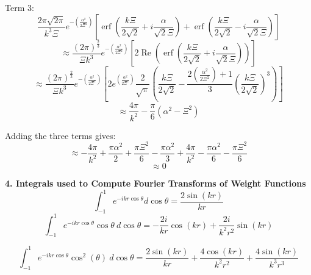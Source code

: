\documentclass[double,12pt]{beavtex}
\begin{document}
Term 3:
\begin{equation}{\frac{2\pi\sqrt{2\pi}}{k^3\Xi}e^{-\left(\frac{\alpha^2}{2\Xi^2}\right)}\left[\operatorname{erf}\left(\frac{k\Xi}{2\sqrt{2}}+i\frac{\alpha}{\sqrt{2}\Xi}\right)+\operatorname{erf}\left(\frac{k\Xi}{2\sqrt{2}}-i\frac{\alpha}{\sqrt{2}\Xi}\right)\right]}\end{equation}
\begin{displaymath}{\approx\frac{\left(2\pi\right)^\frac{2}{3}}{\Xi{k}^3}e^{-\left(\frac{\alpha^2}{2\Xi^2}\right)}\left[2\operatorname{Re}\left(\operatorname{erf}\left(\frac{k\Xi}{2\sqrt{2}}+i\frac{\alpha}{\sqrt{2}\Xi}\right)\right)\right]}\end{displaymath} 
\begin{displaymath}{\approx\frac{\left(2\pi\right)^\frac{2}{3}}{\Xi{k}^3}e^{-\left(\frac{\alpha^2}{2\Xi^2}\right)}\left[2e^{\left(\frac{\alpha^2}{2\Xi^2}\right)}\frac{2}{\sqrt{\pi}}   \left(\frac{k\Xi}{2\sqrt{2}}   -\frac{2\left(\frac{\alpha^2}{2\Xi^2}\right)+1}{3}\left(\frac{k\Xi}{2\sqrt{2}}\right)^3\right)\right]}\end{displaymath}
\begin{displaymath}{\approx\frac{4\pi}{k^2}-\frac{\pi}{6}\left(\alpha^2-\Xi^2\right)}\end{displaymath}  

Adding the three terms gives:
\begin{displaymath}{\approx-\frac{4\pi}{k^2}+\frac{\pi\alpha^2}{2}+\frac{\pi\Xi^2}{6}-\frac{\pi\alpha^2}{3}+\frac{4\pi}{k^2}-\frac{\pi\alpha^2}{6}-\frac{\pi\Xi^2}{6}}\end{displaymath} 
\begin{displaymath}{\approx0}\end{displaymath} 

\textbf{4. Integrals used to Compute Fourier Transforms of Weight Functions}
\begin{equation}{\int_{-1}^{1}{e^{-ikr\cos{\theta}}d{\cos{\theta}}}=\frac{2\sin(kr)}{kr}}\end{equation} 
\begin{equation}{\int_{-1}^{1}{e^{-ikr\cos{\theta}}\cos{\theta}{~}d{\cos{\theta}}}=-\frac{2i}{kr}\cos(kr)+\frac{2i}{k^2r^2}\sin(kr)}\end{equation} 

\begin{equation}{\int_{-1}^{1}{e^{-ikr\cos{\theta}}\cos^2(\theta)~d{\cos{\theta}}}=\frac{2\sin(kr)}{kr}+\frac{4\cos(kr)}{k^2r^2}+\frac{4\sin(kr)}{k^3r^3}}\end{equation} 
\end{document}
